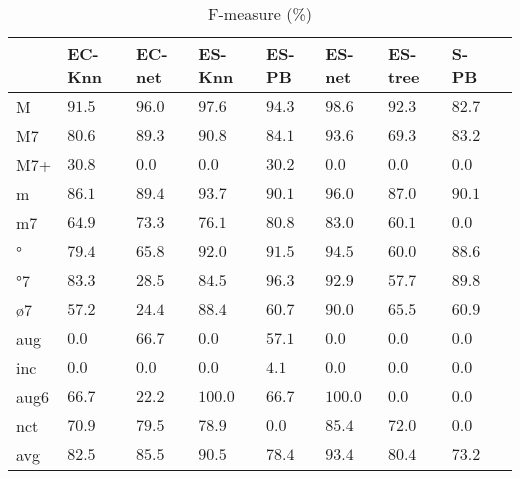 \documentclass{article}
\begin{document}
\begin{table}
  \centering
\begin{tabular}{l|p{0.5cm}p{0.5cm}p{0.5cm}p{0.5cm}p{0.5cm}p{0.5cm}p{0.5cm}p{0.5cm}}
       &      EC-Knn &      EC-net &      ES-Knn &       ES-PB &      ES-net &     ES-tree &        S-PB &  \\ \hline
   M & $     91.5$ & $     96.0$ & $     97.6$ & $     94.3$ & $     98.6$ & $     92.3$ & $     82.7$ &  \\
  M7 & $     80.6$ & $     89.3$ & $     90.8$ & $     84.1$ & $     93.6$ & $     69.3$ & $     83.2$ &  \\
 M7+ & $     30.8$ & $      0.0$ & $      0.0$ & $     30.2$ & $      0.0$ & $      0.0$ & $      0.0$ &  \\
   m & $     86.1$ & $     89.4$ & $     93.7$ & $     90.1$ & $     96.0$ & $     87.0$ & $     90.1$ &  \\
  m7 & $     64.9$ & $     73.3$ & $     76.1$ & $     80.8$ & $     83.0$ & $     60.1$ & $      0.0$ &  \\
  ° & $     79.4$ & $     65.8$ & $     92.0$ & $     91.5$ & $     94.5$ & $     60.0$ & $     88.6$ &  \\
 °7 & $     83.3$ & $     28.5$ & $     84.5$ & $     96.3$ & $     92.9$ & $     57.7$ & $     89.8$ &  \\
 ø7 & $     57.2$ & $     24.4$ & $     88.4$ & $     60.7$ & $     90.0$ & $     65.5$ & $     60.9$ &  \\
 aug & $      0.0$ & $     66.7$ & $      0.0$ & $     57.1$ & $      0.0$ & $      0.0$ & $      0.0$ &  \\
 inc & $      0.0$ & $      0.0$ & $      0.0$ & $      4.1$ & $      0.0$ & $      0.0$ & $      0.0$ &  \\
aug6 & $     66.7$ & $     22.2$ & $    100.0$ & $     66.7$ & $    100.0$ & $      0.0$ & $      0.0$ &  \\
 nct & $     70.9$ & $     79.5$ & $     78.9$ & $      0.0$ & $     85.4$ & $     72.0$ & $      0.0$ &  \\
\hline
 avg & $     82.5$ & $     85.5$ & $     90.5$ & $     78.4$ & $     93.4$ & $     80.4$ & $     73.2$ &  \\
\end{tabular}


  \caption{F-measure (\%)}
  \label{tab:f-measure}
\end{table}
\end{document}
